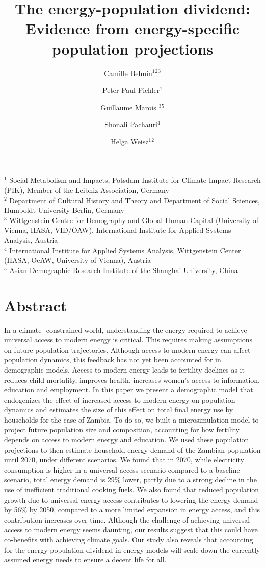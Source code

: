 \documentclass[
]{article}
\title{The energy-population dividend: Evidence from energy-specific population projections}
\author{Camille Belmin\(^1\)\(^2\)\(^3\) \and Peter-Paul Pichler\(^1\) \and Guillaume Marois \(^3\)\(^5\) \and Shonali Pachauri\(^4\) \and Helga Weisz\(^1\)\(^2\)}
\date{}
\begin{document}
\maketitle

\(^1\) Social Metabolism and Impacts, Potsdam Institute for Climate Impact Research (PIK), Member of the Leibniz Association, Germany\\
\(^2\) Department of Cultural History and Theory and Department of Social Sciences, Humboldt University Berlin, Germany\\
\(^3\) Wittgenstein Centre for Demography and Global Human Capital (University of Vienna, IIASA, VID/ÖAW), International Institute for Applied Systems Analysis, Austria\\
\(^4\) International Institute for Applied Systems Analysis, Wittgenstein Center (IIASA, OeAW, University of Vienna), Austria\\
\(^5\) Asian Demographic Research Institute of the Shanghai University, China

\hypertarget{abstract}{%
\section*{Abstract}\label{abstract}}

In a climate- constrained world, understanding the energy required to achieve universal access to modern energy is critical. This requires making assumptions on future population trajectories. Although access to modern energy can affect population dynamics, this feedback has not yet been accounted for in demographic models. Access to modern energy leads to fertility declines as it reduces child mortality, improves health, increases women's access to information, education and employment. In this paper we present a demographic model that endogenizes the effect of increased access to modern energy on population dynamics and estimates the size of this effect on total final energy use by households for the case of Zambia. To do so, we built a microsimulation model to project future population size and composition, accounting for how fertility depends on access to modern energy and education. We used these population projections to then estimate household energy demand of the Zambian population until 2070, under different scenarios. We found that in 2070, while electricity consumption is higher in a universal access scenario compared to a baseline scenario, total energy demand is 29\% lower, partly due to a strong decline in the use of inefficient traditional cooking fuels. We also found that reduced population growth due to universal energy access contributes to lowering the energy demand by 56\% by 2050, compared to a more limited expansion in energy access, and this contribution increases over time. Although the challenge of achieving universal access to modern energy seems daunting, our results suggest that this could have co-benefits with achieving climate goals. Our study also reveals that accounting for the energy-population dividend in energy models will scale down the currently assumed energy needs to ensure a decent life for all.
\end{document}
